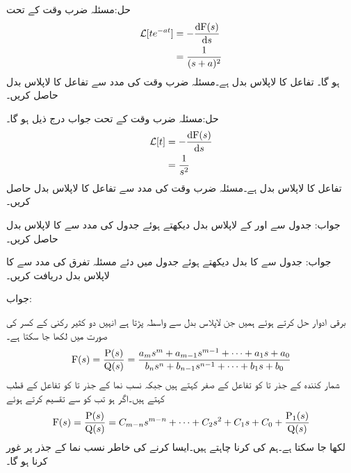 حل:مسئلہ ضرب وقت کے  تحت
\begin{align*}
\Laplace[te^{-at}] &=-\frac{\dif \bF(s)}{\dif s}\\
&=\frac{1}{(s+a)^2}
\end{align*}
ہو گا۔
تفاعل  کا لاپلاس بدل  ہے۔مسئلہ ضرب وقت کی مدد سے تفاعل  کا  لاپلاس بدل حاصل کریں۔

حل:مسئلہ ضرب وقت کے تحت جواب درج ذیل ہو گا۔
\begin{align*}
\Laplace[t]&=-\frac{\dif \bF(s)}{\dif s}\\
&=\frac{1}{s^2}
\end{align*}
تفاعل  کا لاپلاس بدل  ہے۔مسئلہ ضرب وقت کی مدد سے تفاعل  کا لاپلاس بدل حاصل کریں۔

جواب:
جدول  سے  اور  کے لاپلاس بدل دیکھتے ہوئے جدول   کی مدد سے  کا لاپلاس بدل حاصل کریں۔

جواب:
جدول  سے  کا بدل دیکھتے ہوئے جدول   میں دئے مسئلہ تفرق کی مدد سے  کا لاپلاس بدل دریافت کریں۔

جواب:

برقی ادوار حل کرتے ہوئے ہمیں جن لاپلاس بدل سے واسطہ پڑتا ہے انہیں دو کثیر رکنی کے کسر کی صورت میں لکھا جا سکتا ہے۔
\begin{align}\label{مساوات_لاپلاس_عمومی_الف}
{\ensuremath{{\textup{F}}}}(s)=\frac{{{\textup{P}}}(s)}{{{\textup{Q}}}(s)}=\frac{a_m s^m+a_{m-1} s^{m-1}+\cdots+a_1 s+a_0}{b_n s^n+b_{n-1} s^{n-1}+\cdots+b_1 s+b_0}
\end{align}
شمار کنندہ  کے جذر  تا   کو تفاعل کے صفر کہتے ہیں جبکہ نسب نما  کے جذر   تا  کو تفاعل کے قطب کہتے ہیں۔اگر  ہو تب  کو  سے تقسیم کرتے ہوئے
\begin{align}\label{مساوات_لاپلاس_عمومی_ب}
{\ensuremath{{\textup{F}}}}(s)=\frac{{{\textup{P}}}(s)}{{{\textup{Q}}}(s)}=C_{m-n}s^{m-n}+\cdots+C_2 s^2+C_1 s+C_0+\frac{{{\textup{P}}}_1(s)}{{{\textup{Q}}}(s)}
\end{align}
لکھا جا سکتا ہے۔ہم  کی  کرنا چاہتے ہیں۔ایسا کرنے کی خاطر نسب نما  کے جذر پر غور کرنا ہو گا۔


